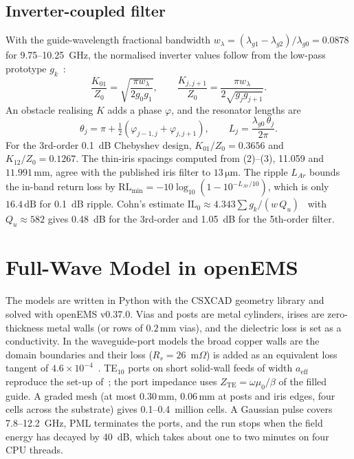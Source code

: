 \documentclass[conference]{IEEEtran}
\newcommand{\SI}[2]{\ensuremath{#1\,\mathrm{#2}}}
\begin{document}
\subsection{Inverter-coupled filter}
With the guide-wavelength fractional bandwidth $w_\lambda=(\lambda_{g1}-\lambda_{g2})/\lambda_{g0}=0.0878$ for 9.75--10.25~GHz, the normalised inverter values follow from the low-pass prototype $g_k$~\cite{matthaei1980}:
\begin{equation}
\frac{K_{01}}{Z_0}=\sqrt{\frac{\pi w_\lambda}{2g_0g_1}},\qquad
\frac{K_{j,j+1}}{Z_0}=\frac{\pi w_\lambda}{2\sqrt{g_jg_{j+1}}}.
\end{equation}
An obstacle realising $K$ adds a phase $\varphi$, and the resonator lengths are
\begin{equation}
\theta_j=\pi+\tfrac{1}{2}\left(\varphi_{j-1,j}+\varphi_{j,j+1}\right),\qquad L_j=\frac{\lambda_{g0}\,\theta_j}{2\pi}.
\end{equation}
For the 3rd-order 0.1~dB Chebyshev design, $K_{01}/Z_0=0.3656$ and $K_{12}/Z_0=0.1267$. The thin-iris spacings computed from (2)--(3), 11.059 and \SI{11.991}{mm}, agree with the published iris filter to \SI{13}{\mu m}. The ripple $L_{Ar}$ bounds the in-band return loss by $\mathrm{RL}_\mathrm{min}=-10\log_{10}(1-10^{-L_{Ar}/10})$, which is only \SI{16.4}{dB} for 0.1~dB ripple. Cohn's estimate $\mathrm{IL}_0\approx4.343\sum g_k/(w\,Q_u)$~\cite{cohn1959} with $Q_u\approx582$ gives 0.48~dB for the 3rd-order and 1.05~dB for the 5th-order filter.

\section{Full-Wave Model in openEMS}
The models are written in Python with the CSXCAD geometry library and solved with openEMS v0.37.0. Vias and posts are metal cylinders, irises are zero-thickness metal walls (or rows of \SI{0.2}{mm} vias), and the dielectric loss is set as a conductivity. In the waveguide-port models the broad copper walls are the domain boundaries and their loss ($R_s=26$~m$\Omega$) is added as an equivalent loss tangent of $4.6\times10^{-4}$~\cite{pozar2011}. TE$_{10}$ ports on short solid-wall feeds of width $a_\mathrm{eff}$ reproduce the set-up of~\cite{bandar2022}; the port impedance uses $Z_\mathrm{TE}=\omega\mu_0/\beta$ of the filled guide. A graded mesh (at most \SI{0.30}{mm}, \SI{0.06}{mm} at posts and iris edges, four cells across the substrate) gives 0.1--0.4~million cells. A Gaussian pulse covers 7.8--12.2~GHz, PML terminates the ports, and the run stops when the field energy has decayed by 40~dB, which takes about one to two minutes on four CPU threads.
\end{document}
